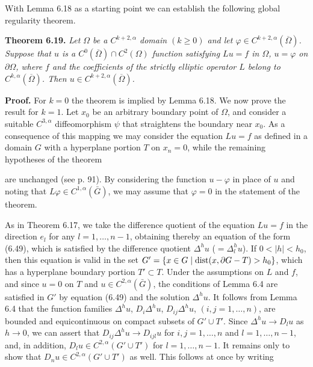 \begin{flushleft}
With Lemma 6.18 as a starting point we can establish the following global
regularity theorem.
\end{flushleft}

\begin{flushleft}
\textbf{Theorem 6.19.} \emph{Let $\Omega$ be a $C^{k+2,\alpha}$ domain $(k \geq 0)$ and let $\varphi \in C^{k+2,\alpha}(\overline{\Omega})$. Suppose
that $u$ is a $C^0(\overline{\Omega}) \cap C^2(\Omega)$ function satisfying $Lu = f$ in $\Omega$, $u = \varphi$ on $\partial \Omega$, where $f$ and
the coefficients of the strictly elliptic operator $L$ belong to $C^{k,\alpha}(\overline{\Omega})$. Then $u \in C^{k+2,\alpha}(\overline{\Omega})$.}
\end{flushleft}

\begin{flushleft}
\textbf{Proof.} For $k = 0$ the theorem is implied by Lemma 6.18. We now prove the result
for $k = 1$. Let $x_0$ be an arbitrary boundary point of $\Omega$, and consider a suitable
$C^{3,\alpha}$ diffeomorphism $\psi$ that straightens the boundary near $x_0$. As a consequence of
this mapping we may consider the equation $Lu = f$ as defined in a domain $G$ with
a hyperplane portion $T$ on $x_n = 0$, while the remaining hypotheses of the theorem
\end{flushleft}


are unchanged (see p. 91). By considering the function $u-\varphi$ in place of $u$ and noting that $L\varphi \in C^{1,\alpha}(\bar{G})$, we may assume that $\varphi = 0$ in the statement of the theorem.

As in Theorem 6.17, we take the difference quotient of the equation $Lu=f$ in the direction $e_l$ for any $l=1,\ldots,n-1$, obtaining thereby an equation of the form (6.49), which is satisfied by the difference quotient $\Delta^h u$ ($=\Delta_l^h u$). If $0<|h|<h_0$, then this equation is valid in the set $G'=\{x\in G\mid \operatorname{dist}(x,\partial G-T)>h_0\}$, which has a hyperplane boundary portion $T' \subset T$. Under the assumptions on $L$ and $f$, and since $u=0$ on $T$ and $u\in C^{2,\alpha}(\bar{G})$, the conditions of Lemma 6.4 are satisfied in $G'$ by equation (6.49) and the solution $\Delta^h u$. It follows from Lemma 6.4 that the function families $\Delta^h u$, $D_i\Delta^h u$, $D_{ij}\Delta^h u$, $(i,j=1,\ldots,n)$, are bounded and equicontinuous on compact subsets of $G' \cup T'$. Since $\Delta^h u \to D_lu$ as $h\to0$, we can assert that $D_{ij}\Delta^h u \to D_{ijl}u$ for $i,j=1,\ldots,n$ and $l=1,\ldots,n-1$, and, in addition, $D_lu \in C^{2,\alpha}(G' \cup T')$ for $l=1,\ldots,n-1$. It remains only to show that $D_nu \in C^{2,\alpha}(G' \cup T')$ as well. This follows at once by writing

